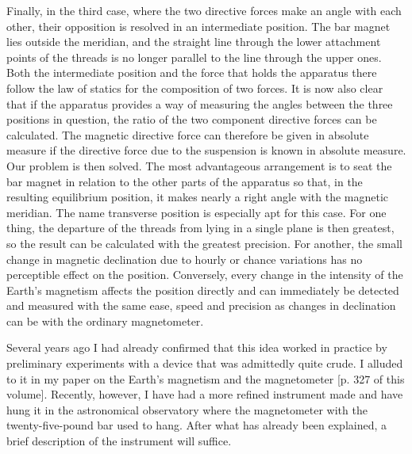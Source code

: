 Finally, in the third case, where the two directive forces make an angle with each other, their opposition is resolved in an intermediate position. The bar magnet lies outside the meridian, and the straight line through the lower attachment points of the threads is no longer parallel to the line through the upper ones. Both the intermediate position and the force that holds the apparatus there follow the law of statics for the composition of two forces. It is now also clear that if the apparatus provides a way of measuring the angles between the three positions in question, the ratio of the two component directive forces can be calculated. The magnetic directive force can therefore be given in absolute measure if the directive force due to the suspension is known in absolute measure. Our problem is then solved. The most advantageous arrangement is to seat the bar magnet in relation to the other parts of the apparatus so that, in the resulting equilibrium position, it makes nearly a right angle with the magnetic meridian. The name transverse position is especially apt for this case. For one thing, the departure of the threads from lying in a single plane is then greatest, so the result can be calculated with the greatest precision. For another, the small change in magnetic declination due to hourly or chance variations has no perceptible effect on the position. Conversely, every change in the intensity of the Earth’s magnetism affects the position directly and can immediately be detected and measured with the same ease, speed and precision as changes in declination can be with the ordinary magnetometer.

Several years ago I had already confirmed that this idea worked in practice by preliminary experiments with a device that was admittedly quite crude. I alluded to it in my paper on the Earth’s magnetism and the magnetometer [p. 327 of this volume]. Recently, however, I have had a more refined instrument made and have hung it in the astronomical observatory where the magnetometer with the twenty-five-pound bar used to hang. After what has already been explained, a brief description of the instrument will suffice.


